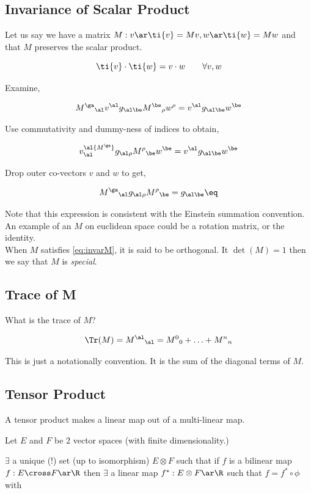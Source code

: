 \documentclass{article}
\begin{document}
\subsection{Invariance of Scalar Product}

Let us say we have a matrix $M : v \ar \ti{v} = Mv, w \ar \ti{w} = Mw$ and that $M$ preserves the scalar product.

\[ \ti{v} \cdot \ti{w} = v \cdot w \qquad \forall v, w \]

Examine,

\[ {M^\ga}_\al v^\al g_{\al\be} {M^\be}_\rho w^\rho = v^\al g_{\al\be}w^\be \]

Use commutativity and dummy-ness of indices to obtain,

\[ v^\al {M^\ga}_\al g_{\al\rho} {M^\rho}_\be w^\be = v^\al g_{\al\be}w^\be \]

Drop outer co-vectors $v$ and $w$ to get,

\[ {M^\ga}_\al g_{\al\rho} {M^\rho}_\be = g_{\al\be} \eq \label{eq:invarM} \]

Note that this expression is consistent with the Einstein summation convention. \\

An example of an $M$ on euclidean space could be a rotation matrix, or the identity. \\

When $M$ satisfies \ref{eq:invarM}, it is said to be orthogonal. It $\det(M) = 1$ then we say that $M$ is \textit{special}.

\subsection{Trace of M}

What is the trace of $M$?

\[ \Tr(M) = {M^\al}_\al = {M^0}_0 + \ldots + {M^n}_n\]

This is just a notationally convention. It is the sum of the diagonal terms of $M$.

\subsection{Tensor Product}

A tensor product makes a linear map out of a multi-linear map.


Let $E$ and $F$ be 2 vector spaces (with finite dimensionality.)

$\exists $ a unique ($!$) set (up to isomorphism) $E \otimes F$ such that if $f$ is a bilinear map $f: E \cross F \ar \R$ then $\exists$ a linear map $f^* : E \otimes F \ar \R$ such that $f = f^* \circ \phi$ with
\end{document}
